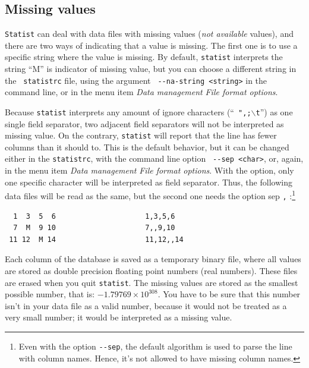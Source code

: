 \documentclass[12pt,english]{article}
\newcommand{\st}{{\tt sta\-tist} }
\begin{document}
\subsection{Missing values}

{\tt Statist} can deal with data files with missing values
({\em not available} values), and there are two ways of
indicating that a value is missing. The first one is to use
a specific string where the value is missing. By default,
\st interprets the string ``M'' is indicator of missing
value, but you can choose a different string in the {\tt
statistrc} file, using the argument {\tt
{-}-na-string~<string>} in the command line, or in the menu
item {\em Data management} {\textbar} {\em File format
options}.

Because \st interprets any amount of ignore characters
(``{\tt ~",;}$\backslash${\tt t}'') as one single field
separator, two adjacent field separators will not be
interpreted as missing value. On the contrary, \st will
report that the line has fewer columns than it should to.
This is the default behavior, but it can be changed either
in the {\tt statistrc}, with the command line option {\tt
{-}-sep~<char>}, or, again, in the menu item {\em Data
management} {\textbar} {\em File format options}. With the
option, only one specific character will be interpreted as
field separator.  Thus, the following data files will be
read as the same, but the second one needs the option
\verb --sep \verb "," :\footnote{Even with the option {\tt {-}-sep},
the default algorithm is used to parse the line
with column names. Hence, it's not allowed to have missing
column names.}

\begin{verbatim}
  1  3  5  6                     1,3,5,6
  7  M  9 10                     7,,9,10
 11 12  M 14                     11,12,,14
\end{verbatim}

Each column of the database is saved as a temporary binary
file, where all values are stored as double precision
floating point numbers (real numbers). These files are
erased when you quit {\tt sta\-tist}. The missing values are
stored as the smallest possible number, that is: $-1.79769
\times 10^{308}$.  You have to be sure that this number
isn't in your data file as a valid number, because it would
not be treated as a very small number; it would be
interpreted as a missing value.
\end{document}
